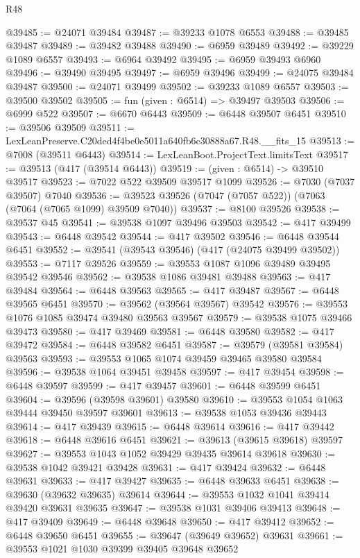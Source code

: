 \begin{lexlean}{R48}
\begin{coremodule}
@39485 := @24071 @39484
@39487 := @39233 @1078 @6553
@39488 := @39485 @39487
@39489 := @39482 @39488
@39490 := @6959 @39489
@39492 := @39229 @1089 @6557
@39493 := @6964 @39492
@39495 := @6959 @39493 @6960
@39496 := @39490 @39495
@39497 := @6959 @39496
@39499 := @24075 @39484 @39487
@39500 := @24071 @39499
@39502 := @39233 @1089 @6557
@39503 := @39500 @39502
@39505 := fun (given : @6514) => @39497 @39503
@39506 := @6999 @522
@39507 := @6670 @6443
@39509 := @6448 @39507 @6451
@39510 := @39506 @39509
@39511 := LexLeanPreserve.C20ded4f4be0e5011a640fb6c30888a67.R48.__fits_15
@39513 := @7008 (@39511 @6443)
@39514 := LexLeanBoot.ProjectText.limitsText
@39517 := @39513 (@417 (@39514 @6443))
@39519 := (given : @6514) -> @39510 @39517
@39523 := @7022 @522 @39509 @39517 @1099
@39526 := @7030 (@7037 @39507) @7040
@39536 := @39523 @39526 (@7047 (@7057 @522)) (@7063 (@7064 (@7065 @1099) @39509 @7040))
@39537 := @8100 @39526
@39538 := @39537 @45
@39541 := @39538 @1097 @39496 @39503
@39542 := @417 @39499
@39543 := @6448 @39542
@39544 := @417 @39502
@39546 := @6448 @39544 @6451
@39552 := @39541 (@39543 @39546) (@417 (@24075 @39499 @39502))
@39553 := @7117 @39526
@39559 := @39553 @1087 @1096 @39489 @39495 @39542 @39546
@39562 := @39538 @1086 @39481 @39488
@39563 := @417 @39484
@39564 := @6448 @39563
@39565 := @417 @39487
@39567 := @6448 @39565 @6451
@39570 := @39562 (@39564 @39567) @39542
@39576 := @39553 @1076 @1085 @39474 @39480 @39563 @39567
@39579 := @39538 @1075 @39466 @39473
@39580 := @417 @39469
@39581 := @6448 @39580
@39582 := @417 @39472
@39584 := @6448 @39582 @6451
@39587 := @39579 (@39581 @39584) @39563
@39593 := @39553 @1065 @1074 @39459 @39465 @39580 @39584
@39596 := @39538 @1064 @39451 @39458
@39597 := @417 @39454
@39598 := @6448 @39597
@39599 := @417 @39457
@39601 := @6448 @39599 @6451
@39604 := @39596 (@39598 @39601) @39580
@39610 := @39553 @1054 @1063 @39444 @39450 @39597 @39601
@39613 := @39538 @1053 @39436 @39443
@39614 := @417 @39439
@39615 := @6448 @39614
@39616 := @417 @39442
@39618 := @6448 @39616 @6451
@39621 := @39613 (@39615 @39618) @39597
@39627 := @39553 @1043 @1052 @39429 @39435 @39614 @39618
@39630 := @39538 @1042 @39421 @39428
@39631 := @417 @39424
@39632 := @6448 @39631
@39633 := @417 @39427
@39635 := @6448 @39633 @6451
@39638 := @39630 (@39632 @39635) @39614
@39644 := @39553 @1032 @1041 @39414 @39420 @39631 @39635
@39647 := @39538 @1031 @39406 @39413
@39648 := @417 @39409
@39649 := @6448 @39648
@39650 := @417 @39412
@39652 := @6448 @39650 @6451
@39655 := @39647 (@39649 @39652) @39631
@39661 := @39553 @1021 @1030 @39399 @39405 @39648 @39652

\end{coremodule}
\end{lexlean}

